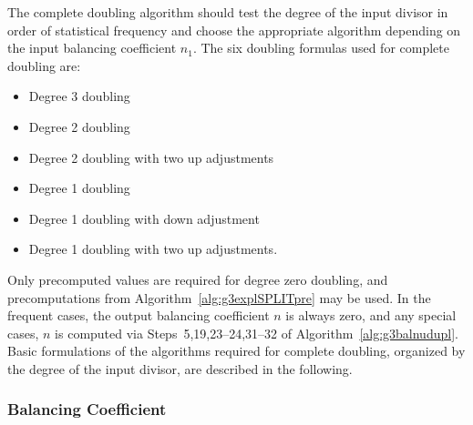 The complete doubling algorithm should test the degree of the input divisor in
order of statistical frequency and choose the appropriate algorithm depending on
the input balancing coefficient $n_1$. The six doubling formulas used for
complete doubling are:
\begin{itemize}
    \item Degree 3 doubling
    \item Degree 2 doubling
    \item Degree 2 doubling with two up adjustments
    \item Degree 1 doubling
    \item Degree 1 doubling with down adjustment
    \item Degree 1 doubling with two up adjustments. 
\end{itemize}  
Only precomputed values are required for degree zero doubling, and
precomputations from Algorithm~\ref{alg:g3explSPLITpre} may be used. In the
frequent cases, the output balancing coefficient $n$ is always zero, and any
special cases, $n$ is computed via Steps~5,19,23--24,31--32 of
Algorithm~\ref{alg:g3balnudupl}. Basic formulations of the algorithms required
for complete doubling, organized by the degree of the input divisor, are
described in the following.

\subsubsection{Balancing Coefficient}\label{sec:g3expldbl} 

